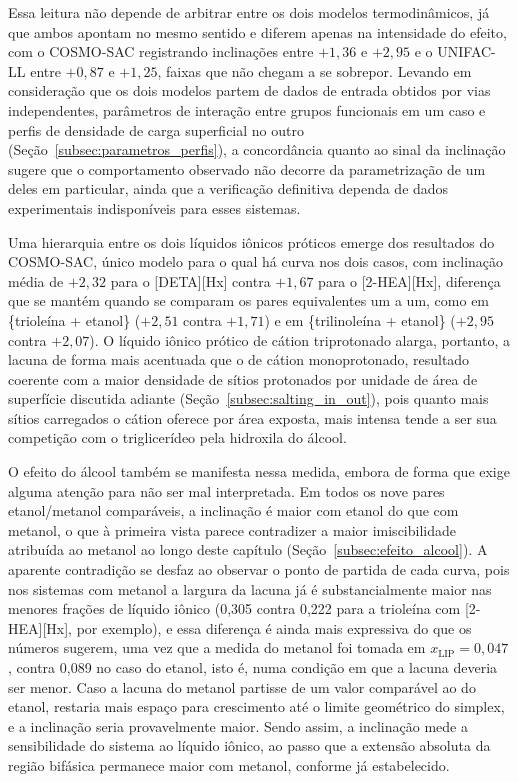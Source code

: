 Essa leitura não depende de arbitrar entre os dois modelos termodinâmicos, já que ambos apontam no mesmo sentido e diferem apenas na intensidade do efeito, com o COSMO-SAC registrando inclinações entre $+1{,}36$ e $+2{,}95$ e o UNIFAC-LL entre $+0{,}87$ e $+1{,}25$, faixas que não chegam a se sobrepor. Levando em consideração que os dois modelos partem de dados de entrada obtidos por vias independentes, parâmetros de interação entre grupos funcionais em um caso e perfis de densidade de carga superficial no outro (Seção~\ref{subsec:parametros_perfis}), a concordância quanto ao sinal da inclinação sugere que o comportamento observado não decorre da parametrização de um deles em particular, ainda que a verificação definitiva dependa de dados experimentais indisponíveis para esses sistemas.

Uma hierarquia entre os dois líquidos iônicos próticos emerge dos resultados do COSMO-SAC, único modelo para o qual há curva nos dois casos, com inclinação média de $+2{,}32$ para o [DETA][Hx] contra $+1{,}67$ para o [2-HEA][Hx], diferença que se mantém quando se comparam os pares equivalentes um a um, como em \{trioleína + etanol\} ($+2{,}51$ contra $+1{,}71$) e em \{trilinoleína + etanol\} ($+2{,}95$ contra $+2{,}07$). O líquido iônico prótico de cátion triprotonado alarga, portanto, a lacuna de forma mais acentuada que o de cátion monoprotonado, resultado coerente com a maior densidade de sítios protonados por unidade de área de superfície discutida adiante (Seção~\ref{subsec:salting_in_out}), pois quanto mais sítios carregados o cátion oferece por área exposta, mais intensa tende a ser sua competição com o triglicerídeo pela hidroxila do álcool.

O efeito do álcool também se manifesta nessa medida, embora de forma que exige alguma atenção para não ser mal interpretada. Em todos os nove pares etanol/metanol comparáveis, a inclinação é maior com etanol do que com metanol, o que à primeira vista parece contradizer a maior imiscibilidade atribuída ao metanol ao longo deste capítulo (Seção~\ref{subsec:efeito_alcool}). A aparente contradição se desfaz ao observar o ponto de partida de cada curva, pois nos sistemas com metanol a largura da lacuna já é substancialmente maior nas menores frações de líquido iônico (0,305 contra 0,222 para a trioleína com [2-HEA][Hx], por exemplo), e essa diferença é ainda mais expressiva do que os números sugerem, uma vez que a medida do metanol foi tomada em $x_{\text{LIP}} = 0{,}047$, contra 0,089 no caso do etanol, isto é, numa condição em que a lacuna deveria ser menor. Caso a lacuna do metanol partisse de um valor comparável ao do etanol, restaria mais espaço para crescimento até o limite geométrico do simplex, e a inclinação seria provavelmente maior. Sendo assim, a inclinação mede a sensibilidade do sistema ao líquido iônico, ao passo que a extensão absoluta da região bifásica permanece maior com metanol, conforme já estabelecido.

